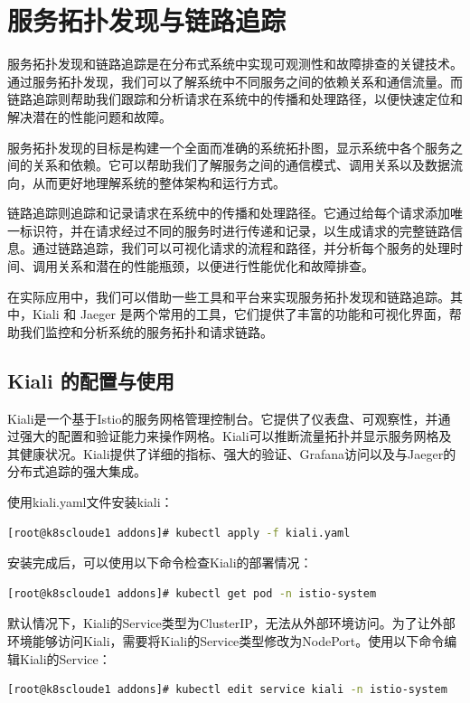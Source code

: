\section{服务拓扑发现与链路追踪}
服务拓扑发现和链路追踪是在分布式系统中实现可观测性和故障排查的关键技术。通过服务拓扑发现，我们可以了解系统中不同服务之间的依赖关系和通信流量。而链路追踪则帮助我们跟踪和分析请求在系统中的传播和处理路径，以便快速定位和解决潜在的性能问题和故障。

服务拓扑发现的目标是构建一个全面而准确的系统拓扑图，显示系统中各个服务之间的关系和依赖。它可以帮助我们了解服务之间的通信模式、调用关系以及数据流向，从而更好地理解系统的整体架构和运行方式。

链路追踪则追踪和记录请求在系统中的传播和处理路径。它通过给每个请求添加唯一标识符，并在请求经过不同的服务时进行传递和记录，以生成请求的完整链路信息。通过链路追踪，我们可以可视化请求的流程和路径，并分析每个服务的处理时间、调用关系和潜在的性能瓶颈，以便进行性能优化和故障排查。

在实际应用中，我们可以借助一些工具和平台来实现服务拓扑发现和链路追踪。其中，Kiali 和 Jaeger 是两个常用的工具，它们提供了丰富的功能和可视化界面，帮助我们监控和分析系统的服务拓扑和请求链路。

\subsection{Kiali 的配置与使用}
Kiali是一个基于Istio的服务网格管理控制台。它提供了仪表盘、可观察性，并通过强大的配置和验证能力来操作网格。Kiali可以推断流量拓扑并显示服务网格及其健康状况。Kiali提供了详细的指标、强大的验证、Grafana访问以及与Jaeger的分布式追踪的强大集成。

使用kiali.yaml文件安装kiali：
\begin{lstlisting}[language=bash]
	[root@k8scloude1 addons]# kubectl apply -f kiali.yaml
\end{lstlisting}

安装完成后，可以使用以下命令检查Kiali的部署情况：
\begin{lstlisting}[language=bash]
[root@k8scloude1 addons]# kubectl get pod -n istio-system
\end{lstlisting}

默认情况下，Kiali的Service类型为ClusterIP，无法从外部环境访问。为了让外部环境能够访问Kiali，需要将Kiali的Service类型修改为NodePort。使用以下命令编辑Kiali的Service：
\begin{lstlisting}[language=bash]
[root@k8scloude1 addons]# kubectl edit service kiali -n istio-system
\end{lstlisting}

